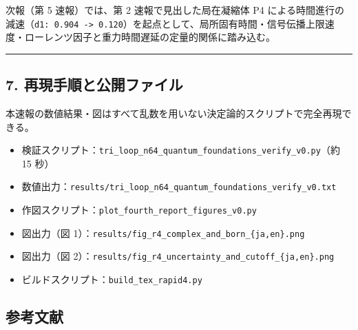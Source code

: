 \documentclass[
  a4paper,
]{ltjsarticle}
\providecommand{\tightlist}{%
  \setlength{\itemsep}{0pt}\setlength{\parskip}{0pt}}
\begin{document}
次報（第 5 速報）では、第 2 速報で見出した局在凝縮体 P4
による時間進行の減速（\texttt{d1:\ 0.904\ -\textgreater{}\ 0.120}）を起点として、局所固有時間・信号伝播上限速度・ローレンツ因子と重力時間遅延の定量的関係に踏み込む。

\begin{center}\rule{0.5\linewidth}{0.5pt}\end{center}

\subsection{7.
再現手順と公開ファイル}\label{ux518dux73feux624bux9806ux3068ux516cux958bux30d5ux30a1ux30a4ux30eb}

本速報の数値結果・図はすべて乱数を用いない決定論的スクリプトで完全再現できる。

\begin{itemize}
\tightlist
\item
  検証スクリプト：\texttt{tri\_loop\_n64\_quantum\_foundations\_verify\_v0.py}（約
  15 秒）
\item
  数値出力：\texttt{results/tri\_loop\_n64\_quantum\_foundations\_verify\_v0.txt}
\item
  作図スクリプト：\texttt{plot\_fourth\_report\_figures\_v0.py}
\item
  図出力（図
  1）：\texttt{results/fig\_r4\_complex\_and\_born\_\{ja,en\}.png}
\item
  図出力（図
  2）：\texttt{results/fig\_r4\_uncertainty\_and\_cutoff\_\{ja,en\}.png}
\item
  ビルドスクリプト：\texttt{build\_tex\_rapid4.py}
\end{itemize}

\subsection{参考文献}\label{ux53c2ux8003ux6587ux732e}
\end{document}
